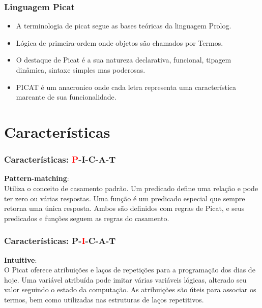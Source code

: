 \documentclass{beamer}
\begin{document}

\begin{frame}
    \frametitle{Linguagem Picat}
    \begin{itemize}
      \item A terminologia de picat segue as bases teóricas da linguagem Prolog.
      \item Lógica de primeira-ordem onde objetos são chamados por Termos.
      \item O destaque de Picat é a sua natureza declarativa, funcional, tipagem dinâmica, sintaxe simples mas poderosas.
      \item PICAT é um anacronico onde cada letra representa uma característica marcante de sua funcionalidade.
    \end{itemize}
\end{frame}


\section{Características}
\begin{frame}
    \frametitle{Características: \textcolor{red}{P}-I-C-A-T}
    \textbf{Pattern-matching}:\\ 
    Utiliza o conceito de casamento padrão. 
    Um predicado define uma relação e pode ter zero ou várias respostas. 
    Uma função é um predicado especial que sempre retorna uma única resposta. 
    Ambos são definidos com regras de Picat, e seus predicados e funções seguem as regras do casamento.
\end{frame}


\begin{frame}
    \frametitle{Características: P-\textcolor{red}{I}-C-A-T}
    \textbf{Intuitive}:\\ 
    O Picat oferece atribuições e laços de repetições para a programação dos dias de hoje. 
    Uma variável atribuída pode imitar várias variáveis lógicas, alterado seu valor seguindo o estado da computação. 
    As atribuições são úteis para associar os termos, bem como utilizadas nas estruturas de laços repetitivos. 
\end{frame}

\end{document}
